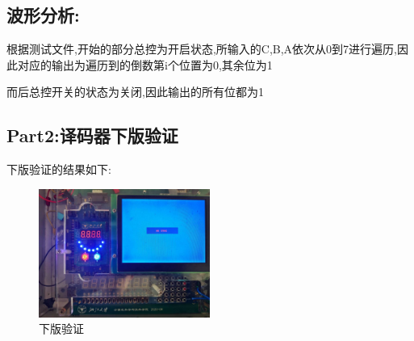 \documentclass{article}
\begin{document}
\subsection*{波形分析:}

根据测试文件,开始的部分总控为开启状态,所输入的{C,B,A}依次从0到7进行遍历,因此对应的输出为遍历到的倒数第i个位置为0,其余位为1

而后总控开关的状态为关闭,因此输出的所有位都为1



\subsection{Part2:译码器下版验证}

下版验证的结果如下:
	\begin{figure}[H]
	\centering
	\includegraphics[width=0.5\textwidth]{11.jpg}
	\caption{\label{Lab5}下版验证}
	\end{figure}
\end{document}
